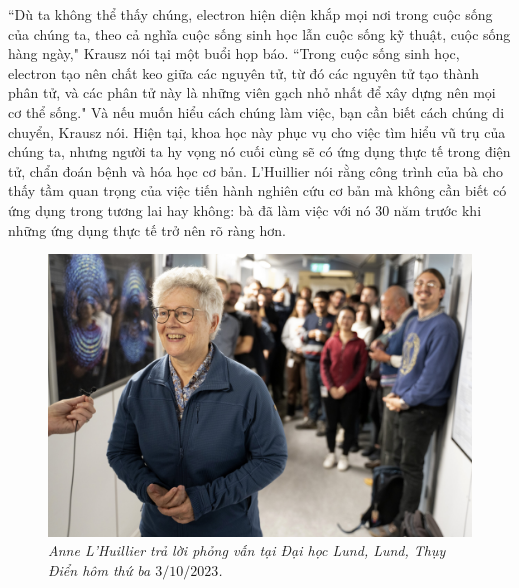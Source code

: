 \begin{multicols}{2}
	\vskip 0.1cm
	``Dù ta không thể thấy chúng, electron hiện diện khắp mọi nơi trong cuộc sống của chúng ta, theo cả nghĩa cuộc sống sinh học lẫn cuộc sống kỹ thuật, cuộc sống hàng ngày," Krausz nói tại một buổi họp báo. ``Trong cuộc sống sinh học, electron tạo nên chất keo giữa các nguyên tử, từ đó các nguyên tử tạo thành phân tử, và các phân tử này là những viên gạch nhỏ nhất để xây dựng nên mọi cơ thể sống."
	\vskip 0.1cm
	Và nếu muốn hiểu cách chúng làm việc, bạn cần biết cách chúng di chuyển, Krausz nói.
	\vskip 0.1cm
	Hiện tại, khoa học này phục vụ cho việc tìm hiểu vũ trụ của chúng ta, nhưng người ta hy vọng nó cuối cùng sẽ có ứng dụng thực tế trong điện tử, chẩn đoán bệnh và hóa học cơ bản.
	\vskip 0.1cm
	L'Huillier nói rằng công trình của bà cho thấy tầm quan trọng của việc tiến hành nghiên cứu cơ bản mà không cần biết có ứng dụng trong tương lai hay không: bà đã làm việc với nó $30$ năm trước khi những ứng dụng thực tế trở nên rõ ràng hơn.
	\begin{figure}[H]
		\vspace*{-5pt}
		\centering
		\captionsetup{labelformat= empty, justification=centering}
		\includegraphics[width= 1\linewidth]{2}
		\caption{\small\textit{\color{timhieukhoahoc}Anne L'Huillier trả lời phỏng vấn tại Đại học Lund, Lund, Thụy Điển hôm thứ ba $3/10/2023$.}}
		\vspace*{-10pt}
	\end{figure}

\end{multicols}
